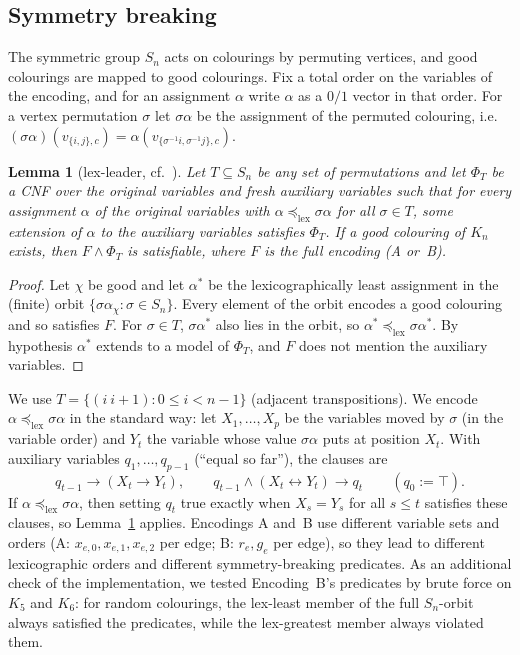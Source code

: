 \documentclass[11pt]{amsart}
\newtheorem{lemma}[theorem]{Lemma}
\theoremstyle{definition}
\theoremstyle{remark}
\newcommand{\lexle}{\preceq_{\mathrm{lex}}}
\begin{document}
\subsection{Symmetry breaking}\label{sec:sb}
The symmetric group $S_n$ acts on colourings by permuting vertices, and good colourings are mapped to good colourings. Fix a total
order on the variables of the encoding, and for an assignment $\alpha$ write $\alpha$ as a $0/1$ vector in that order. For a vertex
permutation $\sigma$ let $\sigma\alpha$ be the assignment of the permuted colouring, i.e.\ $(\sigma\alpha)(v_{\{i,j\},c})=
\alpha(v_{\{\sigma^{-1}i,\sigma^{-1}j\},c})$.

\begin{lemma}[lex-leader, cf.~\cite{CGLR}]\label{lem:lexleader}
Let $T\subseteq S_n$ be any set of permutations and let $\Phi_T$ be a CNF over the original variables and fresh auxiliary variables such
that for every assignment $\alpha$ of the original variables with $\alpha\lexle\sigma\alpha$ for all $\sigma\in T$, some extension of
$\alpha$ to the auxiliary variables satisfies $\Phi_T$. If a good colouring of $K_n$ exists, then $F\wedge\Phi_T$ is satisfiable,
where $F$ is the full encoding (A or~B).
\end{lemma}
\begin{proof}
Let $\chi$ be good and let $\alpha^*$ be the lexicographically least assignment in the (finite) orbit $\{\sigma\alpha_\chi:\sigma\in
S_n\}$. Every element of the orbit encodes a good colouring and so satisfies $F$. For $\sigma\in T$, $\sigma\alpha^*$ also lies in the orbit, so
$\alpha^*\lexle\sigma\alpha^*$. By hypothesis $\alpha^*$ extends to a model of $\Phi_T$, and $F$ does not mention the auxiliary variables.
\end{proof}

We use $T=\{(i\ i{+}1):0\le i<n-1\}$ (adjacent transpositions). We encode $\alpha\lexle\sigma\alpha$ in the standard way: let
$X_1,\dots,X_p$ be the variables moved by $\sigma$ (in the variable order) and $Y_t$ the variable whose value $\sigma\alpha$ puts at
position $X_t$. With auxiliary variables $q_1,\dots,q_{p-1}$ (``equal so far''), the clauses are
\[
q_{t-1}\rightarrow(X_t\rightarrow Y_t),\qquad q_{t-1}\wedge(X_t\leftrightarrow Y_t)\rightarrow q_t\qquad(q_0:=\top).
\]
If $\alpha\lexle\sigma\alpha$, then setting $q_t$ true exactly when $X_s=Y_s$ for all $s\le t$ satisfies these clauses, so
Lemma~\ref{lem:lexleader} applies. Encodings A and~B use different variable sets and orders (A: $x_{e,0},x_{e,1},x_{e,2}$ per edge;
B: $r_e,g_e$ per edge), so they lead to different lexicographic orders and different symmetry-breaking predicates. As an additional
check of the implementation, we tested Encoding~B's predicates by brute force on $K_5$ and $K_6$: for random colourings, the
lex-least member of the full $S_n$-orbit always satisfied the predicates, while the lex-greatest member always violated them.
\end{document}
